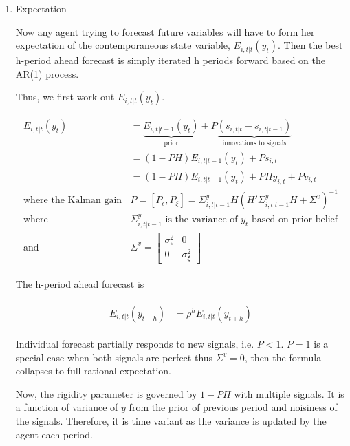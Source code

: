 \documentclass[]{article}
\begin{document}
\begin{enumerate}
	
\item Expectation

Now any agent trying to forecast future variables will have to form her expectation of the contemporaneous state variable, $E_{i,t|t}(y_t)$. Then the best h-period ahead forecast is simply iterated h periods forward based on the AR(1) process.  

Thus, we first work out $E_{i,t|t}(y_t)$.  

\begin{eqnarray}
\begin{aligned}
E_{i,t|t}(y_{t}) 
& =  \underbrace{E_{i,t|t-1}(y_{t})}_{\text{prior}} + P \underbrace {(s_{i,t|t}-s_{i,t|t-1})}_{\text{innovations to signals}} \\
& = (1-PH) E_{i,t|t-1}(y_{t}) + Ps_{i,t} \\
& = (1-PH) E_{i,t|t-1}(y_{t}) + PH y_{i,t} + P v_{i,t} \\
\text{where the Kalman gain }  & P = [P_\epsilon,P_\xi]= \Sigma^y_{i,t|t-1} H(H'\Sigma^y_{i,t|t-1} H + \Sigma^v)^{-1} \\
\text {where } & \Sigma^y_{i,t|t-1} \text{ is the variance of } y_t \text{ based on prior belief}\\
\text {and } & \Sigma^v =  \left[ \begin{matrix} 
  \sigma^2_{\epsilon} &  0 \\ 0 & \sigma^2_\xi \end{matrix}\right] 
\end{aligned}
\end{eqnarray}

The h-period ahead forecast is 

\begin{eqnarray}
\begin{aligned}
E_{i,t|t}(y_{t+h}) & = \rho^{h}E_{i,t|t}(y_{t+h}) 
\end{aligned}
\end{eqnarray}


Individual forecast partially responds to new signals, i.e. $P<1$. $P=1$ is a special case when both signals are perfect thus $\Sigma^v = 0$, then the formula collapses to full rational expectation. 

Now, the rigidity parameter is governed by $1-PH$ with multiple signals. It is a function of variance of $y$ from the prior of previous period and noisiness of the signals. Therefore, it is time variant as the variance is updated by the agent each period.  



\end{enumerate}
\end{document}
